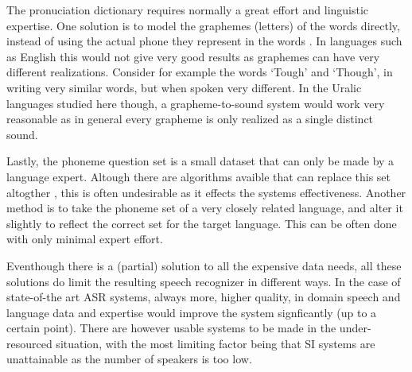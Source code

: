 \documentclass[b5paper]{article}
\begin{document}
The pronuciation dictionary requires normally a great effort and linguistic expertise. One solution is to model the graphemes (letters) of the words directly, instead of using the actual phone they represent in the words \cite{kanthak2003multilingual}. In languages such as English this would not give very good results as graphemes can have very different realizations. Consider for example the words `Tough' and `Though', in writing very similar words, but when spoken very different. In the Uralic languages studied here though, a grapheme-to-sound system would work very reasonable as in general every grapheme is only realized as a single distinct sound.

Lastly, the phoneme question set is a small dataset that can only be made by a language expert. Altough there are algorithms avaible that can replace this set altogther \cite{darjaa2011effective}, this is often undesirable as it effects the systems effectiveness. Another method is to take the phoneme set of a very closely related language, and alter it slightly to reflect the correct set for the target language. This can be often done with only minimal expert effort.

Eventhough there is a (partial) solution to all the expensive data needs, all these solutions do limit the resulting speech recognizer in different ways. In the case of state-of-the art ASR systems, always more, higher quality, in domain speech and language data and expertise would improve the system signficantly (up to a certain point). There are however usable systems to be made in the under-resourced situation, with the most limiting factor being that SI systems are unattainable as the number of speakers is too low.
\end{document}
